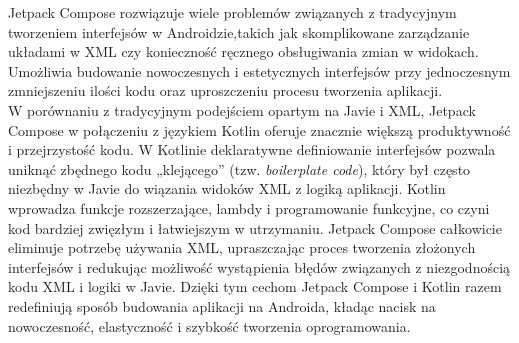 \documentclass[12pt]{article}
\begin{document}
Jetpack Compose rozwiązuje wiele problemów związanych z tradycyjnym tworzeniem interfejsów w Androidzie,takich jak skomplikowane zarządzanie układami w XML
czy konieczność ręcznego obsługiwania zmian w widokach. Umożliwia budowanie nowoczesnych i estetycznych interfejsów przy jednoczesnym zmniejszeniu ilości kodu
oraz uproszczeniu procesu tworzenia aplikacji.\cite{jetpack-compose-mniej-kodu}\\
W porównaniu z tradycyjnym podejściem opartym na Javie i XML, Jetpack Compose w połączeniu z językiem Kotlin oferuje znacznie większą produktywność i przejrzystość kodu.
W Kotlinie deklaratywne definiowanie interfejsów pozwala uniknąć zbędnego kodu „klejącego” (tzw. \textit{boilerplate code}), który był często niezbędny w Javie
do wiązania widoków XML z logiką aplikacji. Kotlin wprowadza funkcje rozszerzające, lambdy i programowanie funkcyjne, co czyni kod bardziej zwięzłym i łatwiejszym w utrzymaniu.
Jetpack Compose całkowicie eliminuje potrzebę używania XML, upraszczając proces tworzenia złożonych interfejsów i redukując możliwość wystąpienia błędów związanych
z niezgodnością kodu XML i logiki w Javie. Dzięki tym cechom Jetpack Compose i Kotlin razem redefiniują sposób budowania aplikacji na Androida,
kładąc nacisk na nowoczesność, elastyczność i szybkość tworzenia oprogramowania.
\end{document}
